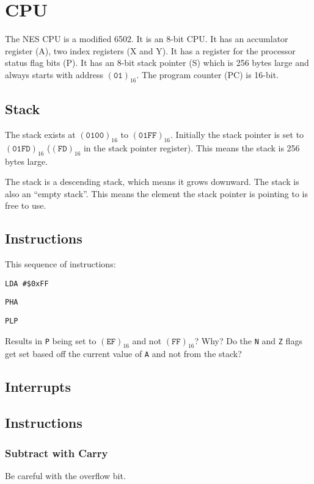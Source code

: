 %

\chapter{CPU}

The NES CPU is a modified 6502. It is an 8-bit CPU. It has an accumlator
register (A), two index registers (X and Y). It has a register for the
processor status flag bits (P). It has an 8-bit stack pointer (S) which is
256 bytes large and always starts with address $(\texttt{01})_{16}$. The
program counter (PC) is 16-bit.

\section{Stack}

The stack exists at $(\texttt{0100})_{16}$ to $(\texttt{01FF})_{16}$.
Initially the stack pointer is set to $(\texttt{01FD})_{16}$
($(\texttt{FD})_{16}$ in the stack pointer register). This means the stack is
256 bytes large.

The stack is a descending stack, which means it grows downward. The stack is
also an ``empty stack''. This means the element the stack pointer is pointing
to is free to use.


\section{Instructions}

This sequence of instructions:

\texttt{LDA \#\$0xFF}

\texttt{PHA}

\texttt{PLP}

\noindent Results in \texttt{P} being set to $(\texttt{EF})_{16}$ and not
$(\texttt{FF})_{16}$? Why? Do the \texttt{N} and \texttt{Z} flags get set
based off the current value of \texttt{A} and not from the stack?

\section{Interrupts}

\section{Instructions}

\subsection{Subtract with Carry}

Be careful with the overflow bit.
